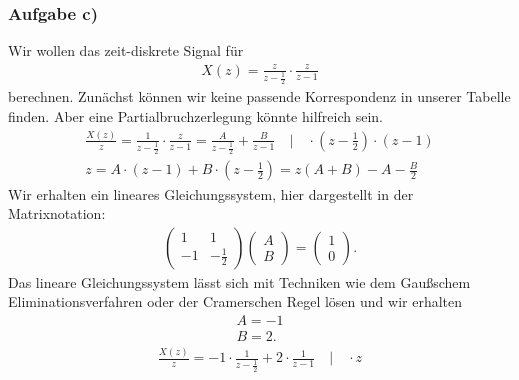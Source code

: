 \documentclass[11pt,a4paper,DIV=12]{scrartcl}
\begin{document}
\subsubsection{Aufgabe c)}
Wir wollen das zeit-diskrete Signal für
\begin{align}
	X(z)=\frac{z}{z-\frac{1}{2}}\cdot\frac{z}{z-1}
\end{align}
berechnen.
Zunächst können wir keine passende Korrespondenz in unserer Tabelle finden. Aber eine Partialbruchzerlegung könnte hilfreich sein.
\begin{align}
	\frac{X(z)}{z}=\frac{1}{z-\frac{1}{2}}\cdot\frac{z}{z-1}=\frac{A}{z-\frac{1}{2}}+\frac{B}{z-1} \quad \Bigg | \quad\cdot (z-\frac{1}{2})\cdot(z-1)\nonumber\\
	z=A\cdot(z-1)+B\cdot(z-\frac{1}{2})=z(A+B)-A-\frac{B}{2}
\end{align}
Wir erhalten ein lineares Gleichungssystem, hier dargestellt in der Matrixnotation:
\begin{align}
	\begin{pmatrix}
		1 & 1\\
		-1 & -\frac{1}{2}
	\end{pmatrix}
	\begin{pmatrix}
		A \\
		B
	\end{pmatrix}
	=
	\begin{pmatrix}
		1 \\
		0
	\end{pmatrix}.
\end{align}
Das lineare Gleichungssystem lässt sich mit Techniken wie dem Gaußschem Eliminationsverfahren oder der Cramerschen Regel lösen und wir erhalten
\begin{align}
	A = -1 \nonumber \\
	B = 2.
\end{align}
\begin{align}
	\frac{X(z)}{z}=-1\cdot\frac{1}{z-\frac{1}{2}}+2\cdot\frac{1}{z-1} \quad\Bigg | \quad \cdot z
\end{align}
\end{document}
